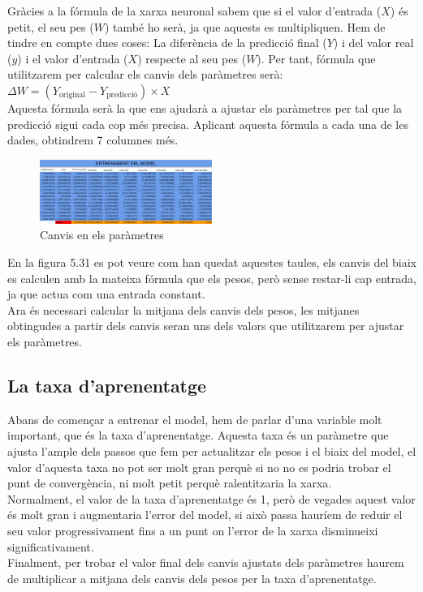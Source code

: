 Gràcies a la fórmula de la xarxa neuronal sabem que si el valor d'entrada ($X$) és petit, el seu pes ($W$) també ho serà, ja que aquests es multipliquen. Hem de tindre en compte dues coses: La diferència de la predicció final ($Y$) i del valor real ($y$) i el valor d'entrada ($X$) respecte al seu pes ($W$). Per tant, fórmula que utilitzarem per calcular els canvis dels paràmetres serà:\\
$\Delta W = (Y_{\text{original}} - Y_{\text{predicció}}) \times X$\\
Aquesta fórmula serà la que ens ajudarà a ajustar els paràmetres per tal que la predicció sigui cada cop més precisa. Aplicant aquesta fórmula a cada una de les dades, obtindrem 7 columnes més.

\begin{figure}[H]
    \centering
    \includegraphics[width=0.5\textwidth]{./figures/Canvis.png}
    \caption{Canvis en els paràmetres}
\end{figure}

En la figura 5.31 es pot veure com han quedat aquestes taules, els canvis del biaix es calculen amb la mateixa fórmula que els pesos, però sense restar-li cap entrada, ja que actua com una entrada constant.\\

Ara és necessari calcular la mitjana dels canvis dels pesos, les mitjanes obtingudes a partir dels canvis seran uns dels valors que utilitzarem per ajustar els paràmetres.

\subsection{La taxa d'aprenentatge}
Abans de començar a entrenar el model, hem de parlar d'una variable molt important, que és la taxa d'aprenentatge. Aquesta taxa és un paràmetre que ajusta l'ample dels passos que fem per actualitzar els pesos i el biaix del model, el valor d'aquesta taxa no pot ser molt gran perquè si no no es podria trobar el punt de convergència, ni molt petit perquè ralentitzaria la xarxa.\\

Normalment, el valor de la taxa d'aprenentatge és 1, però de vegades aquest valor és molt gran i augmentaria l'error del model, si això passa hauríem de reduir el seu valor progressivament fins a un punt on l'error de la xarxa disminueixi significativament.\\
Finalment, per trobar el valor final dels canvis ajustats dels paràmetres haurem de multiplicar a mitjana dels canvis dels pesos per la taxa d'aprenentatge.
